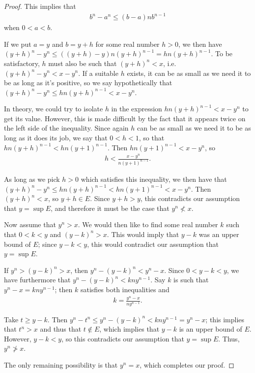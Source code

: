\documentclass[12pt]{article}
\begin{document}
\begin{thm}
\begin{proof}
    This implies that
    \begin{align*}
      b^n - a^n \leq (b - a)nb^{n-1}
    \end{align*}
    when $0 < a < b$.

    If we put $a = y$ and $b = y + h$ for some real number $h > 0$, we then have $(y
    + h)^n - y^n \leq ((y + h) - y)n(y + h)^{n-1} = hn(y + h)^{n-1}$. To be
    satisfactory, $h$ must also be such that $(y + h)^n < x$, i.e. $(y + h)^n - y^n <
    x - y^n$. If a suitable $h$ exists, it can be as small as we need it to be as
    long as it's positive, so we say hypothetically that $(y + h)^n - y^n \leq hn(y +
    h)^{n-1} < x - y^n$.

    In theory, we could try to isolate $h$ in the expression $hn(y + h)^{n-1} < x -
    y^n$ to get its value. However, this is made difficult by the fact that it
    appears twice on the left side of the inequality. Since again $h$ can be as small
    as we need it to be as long as it does its job, we say that $0 < h < 1$, so that
    $hn(y + h)^{n-1} < hn(y + 1)^{n-1}$. Then $hn(y + 1)^{n-1} < x - y^n$, so
    \begin{align*}
      h < \frac{x - y^n}{n(y + 1)^{n-1}}.
    \end{align*}

    As long as we pick $h > 0$ which satisfies this inequality, we then have that $(y
    + h)^n - y^n \leq hn(y + h)^{n-1} < hn(y + 1)^{n-1} < x - y^n$. Then $(y + h)^n <
    x$, so $y + h \in E$. Since $y + h > y$, this contradicts our assumption that $y
    = \sup E$, and therefore it must be the case that $y^n \nless x$.

    Now assume that $y^n > x$. We would then like to find some real number $k$ such
    that $0 < k < y$ and $(y - k)^n > x$. This would imply that $y - k$ was an upper
    bound of $E$; since $y - k < y$, this would contradict our assumption that $y =
    \sup E$.

    If $y^n > (y - k)^n > x$, then $y^n - (y - k)^n < y^n - x$. Since $0 < y - k < y$, we
    have furthermore that $y^n - (y - k)^n < kny^{n-1}$. Say $k$ is such that $y^n -
    x = kny^{n-1}$; then $k$ satisfies both inequalities and
    \begin{align*}
      k = \frac{y^n - x}{ny^{n-1}}.
    \end{align*}

    Take $t \geq y - k$. Then $y^n - t^n \leq y^n - (y - k)^n < kny^{n-1} = y^n - x$;
    this implies that $t^n > x$ and thus that $t \notin E$, which implies that $y -
    k$ is an upper bound of $E$. However, $y - k < y$, so this contradicts our
    assumption that $y = \sup E$. Thus, $y^n \ngtr x$.

    The only remaining possibility is that $y^n = x$, which completes our proof.
  \end{proof}
\end{thm}
\end{document}
